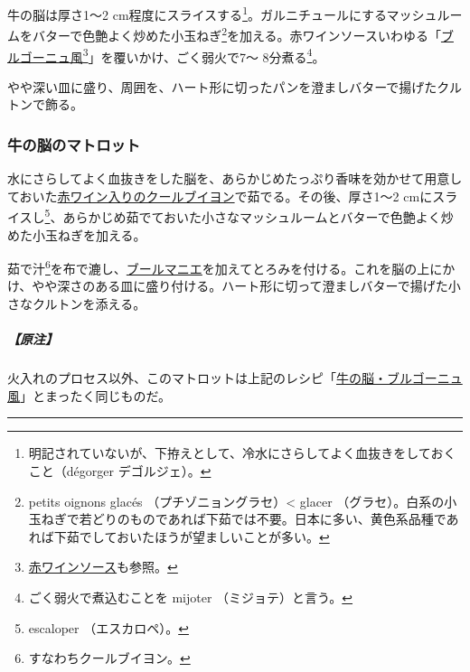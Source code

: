\begin{Main}
牛の脳は厚さ1〜2 cm程度にスライスする\footnote{明記されていないが、下拵えとして、冷水にさらしてよく血抜きをしておくこと（dégorger
  デゴルジェ）。}。ガルニチュールにするマッシュルームをバターで色艶よく炒めた小玉ねぎ\footnote{petits
  oignons glacés （プチゾニョングラセ）\textless{} glacer
  （グラセ）。白系の小玉ねぎで若どりのものであれば下茹では不要。日本に多い、黄色系品種であれば下茹でしておいたほうが望ましいことが多い。}を加える。赤ワインソースいわゆる「\protect\hyperlink{sauce-bourguignonne}{ブルゴーニュ風}\footnote{\protect\hyperlink{sauce-au-vin-rouge}{赤ワインソース}も参照。}」を覆いかけ、ごく弱火で7〜
8分煮る\footnote{ごく弱火で煮込むことを mijoter （ミジョテ）と言う。}。

やや深い皿に盛り、周囲を、ハート形に切ったパンを澄ましバターで揚げたクルトンで飾る。

\hypertarget{matelote-de-cervelle}{%
\subsubsection{牛の脳のマトロット}\label{matelote-de-cervelle}}



水にさらしてよく血抜きをした脳を、あらかじめたっぷり香味を効かせて用意しておいた\protect\hyperlink{cour-bouillon-c}{赤ワイン入りのクールブイヨン}で茹でる。その後、厚さ1〜2
cmにスライスし\footnote{escaloper （エスカロペ）。}、あらかじめ茹でておいた小さなマッシュルームとバターで色艶よく炒めた小玉ねぎを加える。

茹で汁\footnote{すなわちクールブイヨン。}を布で漉し、\protect\hyperlink{beurre-manie}{ブールマニエ}を加えてとろみを付ける。これを脳の上にかけ、やや深さのある皿に盛り付ける。ハート形に切って澄ましバターで揚げた小さなクルトンを添える。

\hypertarget{ux539fux6ce8}{%
\subparagraph{【原注】}\label{ux539fux6ce8}}

火入れのプロセス以外、このマトロットは上記のレシピ「\protect\hyperlink{cervelle-a-la-bourguignonne}{牛の脳・ブルゴーニュ風}」とまったく同じものだ。

\begin{center}\rule{0.5\linewidth}{\linethickness}\end{center}


\end{Main}
